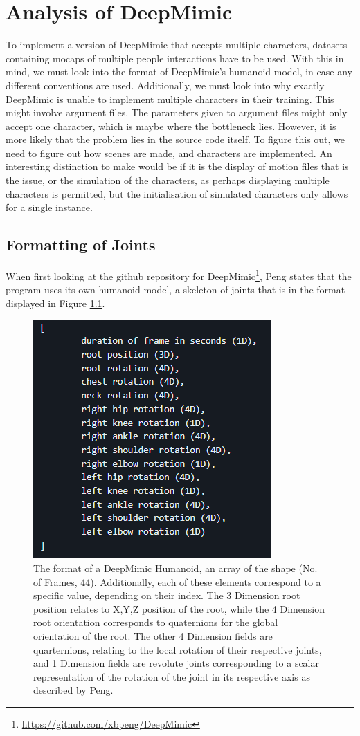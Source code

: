 \documentclass{l4proj}
\begin{document}
\chapter{Analysis of DeepMimic}
To implement a version of DeepMimic that accepts multiple characters, datasets containing mocaps of multiple people interactions have to be used. With this in mind, we must look into the format of DeepMimic's humanoid model, in case any different conventions are used. Additionally, we must look into why exactly DeepMimic is unable to implement multiple characters in their training. This might involve argument files. The parameters given to argument files might only accept one character, which is maybe where the bottleneck lies. However, it is more likely that the problem lies in the source code itself. To figure this out, we need to figure out how scenes are made, and characters are implemented. An interesting distinction to make would be if it is the display of motion files that is the issue, or the simulation of the characters, as perhaps displaying multiple characters is permitted, but the initialisation of simulated characters only allows for a single instance.

\section{Formatting of Joints}
When first looking at the github repository for DeepMimic\footnote{\url{https://github.com/xbpeng/DeepMimic}}, Peng states that the program uses its own humanoid model, a skeleton of joints that is in the format displayed in Figure \ref{fig:deepmimic_format}.

\begin{figure}[htb]
  \centering
  \includegraphics[width=0.5\linewidth]{images/deepmimic_humanoid_format.png}

  \caption{The format of a DeepMimic Humanoid, an array of the shape (No. of Frames, 44). Additionally, each of these elements correspond to a specific value, depending on their index. The 3 Dimension root position relates to X,Y,Z position of the root, while the 4 Dimension root orientation corresponds to quaternions for the global orientation of the root. The other 4 Dimension fields are quarternions, relating to the local rotation of their respective joints, and 1 Dimension fields are revolute joints corresponding to a scalar representation of the rotation of the joint in its respective axis as described by Peng.}

  \label{fig:deepmimic_format}
\end{figure}
\end{document}
